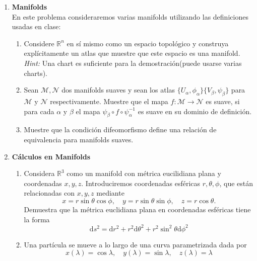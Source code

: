 \documentclass[../main]{subfiles}
\begin{document}
\begin{enumerate}
    \item \textbf{Manifolds} \\
    En este problema consideraremos varias manifolds utilizando las definiciones usadas en clase:
    \begin{enumerate}[label=(\alph*)]
        \item Considere $\mathbb{R}^n$ en sí mismo como un espacio topológico y construya explícitamente un atlas que muestre que este espacio es una manifold. \textit{Hint:} Una chart es suficiente para la demostración(puede usarse varias charts).
        \item Sean $\mathcal{M}, \mathcal{N}$ dos manifolds suaves y sean los atlas $\{ U_{\alpha}, \phi_{\alpha}\}\{V_{\beta}, \psi_{\beta}\}$ para $\mathcal{M}$ y $\mathcal{N}$ respectivamente. Muestre que el mapa $f: \mathcal{M} \rightarrow \mathcal{N}$ es suave, si para cada $\alpha$ y $\beta$ el mapa $\psi_{\beta} \circ f \circ \psi^{-1}_{\alpha}$ es suave en su dominio de definición.
        \item Muestre que la condición difeomorfismo define una relación de equivalencia para manifolds suaves.
    \end{enumerate}
    \item \textbf{Cálculos en Manifolds} 
    \begin{enumerate}[label=(\alph*)]
        \item Considera $\mathbb{R}^3$ como un manifold con métrica eucilidiana plana y coordenadas $x, y, z$. Introduciremos coordenadas esféricas $r, \theta, \phi$, que están relacionadas con $x, y, z$ mediante
        \begin{equation}
            x=r \sin \theta \cos \phi, \quad y=r \sin \theta \sin \phi, \quad z=r\cos \theta.
        \end{equation}
        Demuestra que la métrica euclidiana plana en coordenadas esféricas tiene la forma
        \begin{equation}
            \mathrm{d}s^2=\mathrm{d}r^2+r^2 \mathrm{d}\theta^2+r^2\sin^2 \theta \mathrm{d}\phi^2
        \end{equation}
        \item Una partícula se mueve a lo largo de una curva parametrizada dada por
        \begin{equation}
            x(\lambda)=\cos \lambda, \quad y(\lambda)=\sin \lambda, \quad z(\lambda)=\lambda
        \end{equation}
        \begin{itemize}

\end{itemize}
\end{enumerate}
\end{enumerate}
\end{document}
